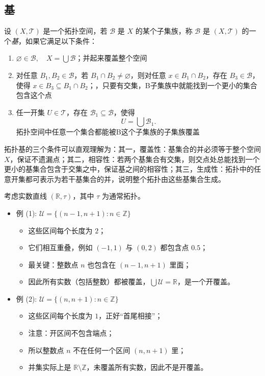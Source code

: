 \subsection{基}
\begin{definition}[拓扑的基]
设 $(X,\mathcal{T})$ 是一个拓扑空间，若 $\mathcal{B}$ 是 $X$ 的某个子集族，称 $\mathcal{B}$ 是 $(X,\mathcal{T})$ 的一个\emph{基}，如果它满足以下条件：
\begin{enumerate}
  \item $\varnothing \in \mathcal{B}, \quad X = \bigcup \mathcal{B}$；并起来覆盖整个空间
  \item 对任意 $B_1,B_2 \in \mathcal{B}$，若 $B_1 \cap B_2 \neq \varnothing$，则对任意 $x \in B_1 \cap B_2$，存在 $B_3 \in \mathcal{B}$，使得 $x \in B_3 \subseteq B_1 \cap B_2$；，只要有交集，B子集族中就能找到一个更小的集合包含这个点
  \item 任一开集 $U \in \mathcal{T}$，存在 $\mathcal{B}_1 \subseteq \mathcal{B}$，使得
  \[
    U = \bigcup \mathcal{B}_1.
  \]拓扑空间中任意一个集合都能被B这个子集族的子集族覆盖
\end{enumerate}
\end{definition}
\begin{remark}
拓扑基的三个条件可以直观理解为：其一，覆盖性：基集合的并必须等于整个空间 $X$，保证不遗漏点；其二，相容性：若两个基集合有交集，则交点处总能找到一个更小的基集合包含于交集之中，保证基之间的相容性；其三，生成性：拓扑中的任意开集都可表示为若干基集合的并，说明整个拓扑由这些基集合生成。
\end{remark}
\begin{example}[开覆盖的对比]
考虑实数直线 $(\mathbb{R},\tau)$，其中 $\tau$ 为通常拓扑。

\begin{itemize}
  \item 例 (1): $\mathcal{U}=\{(n-1,n+1):n\in\mathbb{Z}\}$  
  \begin{itemize}
    \item 这些区间每个长度为 $2$；
    \item 它们相互重叠，例如 $(-1,1)$ 与 $(0,2)$ 都包含点 $0.5$；
    \item 最关键：整数点 $n$ 也包含在 $(n-1,n+1)$ 里面；
    \item 因此所有实数（包括整数）都被覆盖，$\bigcup\mathcal{U}=\mathbb{R}$，是一个开覆盖。
  \end{itemize}

  \item 例 (2): $\mathcal{U}=\{(n,n+1):n\in\mathbb{Z}\}$  
  \begin{itemize}
    \item 这些区间每个长度为 $1$，正好“首尾相接”；
    \item 注意：开区间不包含端点；
    \item 所以整数点 $n$ 不在任何一个区间 $(n,n+1)$ 里；
    \item 并集实际上是 $\mathbb{R}\setminus\mathbb{Z}$，未覆盖所有实数，因此不是开覆盖。
  \end{itemize}
\end{itemize}
\end{example}
